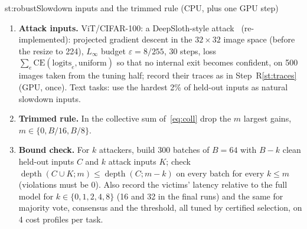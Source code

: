\begin{step}{st:robust}{Slowdown inputs and the trimmed rule (CPU, plus one GPU step)}
\begin{enumerate}
  \item \textbf{Attack inputs.} ViT/CIFAR-100: a DeepSloth-style attack~\cite{sloth} (re-implemented): projected
  gradient descent in the $32\times32$ image space (before the resize to 224), $L_\infty$ budget $\varepsilon=8/255$,
  30 steps, loss $\sum_e \mathrm{CE}(\text{logits}_e,\text{uniform})$ so that no internal exit becomes confident, on
  500 images taken from the tuning half; record their traces as in Step~R\ref{st:traces} (GPU, once). Text tasks:
  use the hardest 2\% of held-out inputs as natural slowdown inputs.
  \item \textbf{Trimmed rule.} In the collective sum of~\eqref{eq:coll} drop the $m$ largest gains,
  $m\in\{0,B/16,B/8\}$.
  \item \textbf{Bound check.} For $k$ attackers, build 300 batches of $B=64$ with $B-k$ clean held-out inputs $C$ and
  $k$ attack inputs $K$; check $\operatorname{depth}(C\cup K;m)\le\operatorname{depth}(C;m-k)$ on every batch for
  every $k\le m$ (violations must be 0). Also record the victims' latency relative to the full model for
  $k\in\{0,1,2,4,8\}$ (16 and 32 in the final runs) and the same for majority vote, consensus and the threshold, all
  tuned by certified selection, on 4 cost profiles per task.
\end{enumerate}
\end{step}


